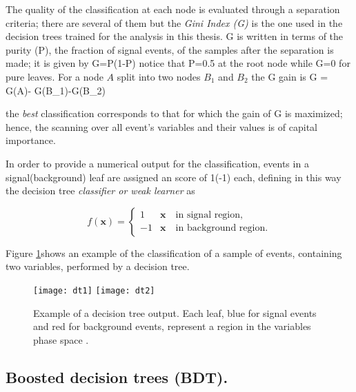 The quality of the classification at each node is evaluated through a separation criteria; there are several of them but the \textit{Gini Index (G)} is the one used in the decision trees trained for the analysis in this thesis. G is written in terms of the purity (P), \ie the fraction of signal events, of the samples after the separation is made; it is given by
\beqn
G=P(1-P)
\eeqn
\noindent notice that P=0.5 at the root node while G=0 for pure leaves. For a node $A$ split into two nodes $B_1$ and $B_2$ the G gain is
\beqn
\Delta G = G(A)- G(B_1)-G(B_2)
\eeqn

\noindent the \textit{best} classification corresponds to that for which the gain of G is maximized; hence, the scanning over all event's variables and their values is of capital importance.

In order to provide a numerical output for the classification, events in a signal(background) leaf are assigned an score of 1(-1) each, defining in this way the decision tree \textit{classifier or weak learner} as

\[
f(\textbf{x}) = \left\{
\begin{array}{ll}
  1  &  \textbf{x} \quad \textrm{in signal region,}\\
  -1 &  \textbf{x} \quad \textrm{in background region.}
\end{array}
\right.
\]

Figure \ref{fig:dtr}shows an example of the classification of a sample of events, containing two variables, performed by a decision tree.

\begin{figure}[!h]
  \centering
  \texttt{[image: dt1]}
  \texttt{[image: dt2]}
  \caption[Decision tree output example.]{Example of a decision tree output. Each leaf, blue for signal events and red for background events, represent a region in the variables phase space \cite{coadou}.}\label{fig:dtr}
\end{figure}

\subsection{Boosted decision trees (BDT).}

